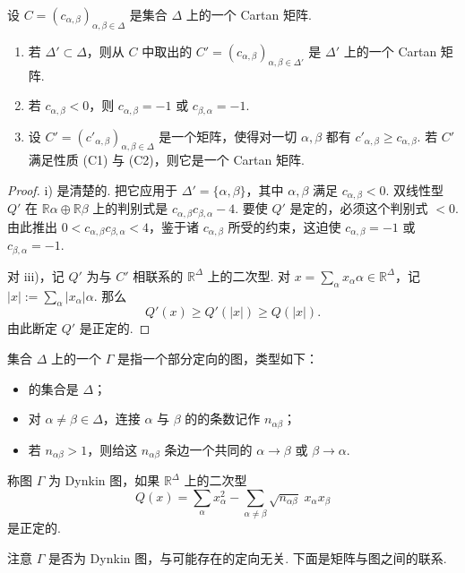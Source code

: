 \begin{lemma}\label{lemma:ssl-3-4-2}
设 $C=(c_{\alpha,\beta})_{\alpha,\beta\in\Delta}$ 是集合 $\Delta$ 上的一个 Cartan 矩阵.
\begin{enumerate}[label=\roman*)]
\item 若 $\Delta'\subset\Delta$，则从 $C$ 中取出的 $C'=(c_{\alpha,\beta})_{\alpha,\beta\in\Delta'}$ 是 $\Delta'$ 上的一个 Cartan 矩阵.
\item 若 $c_{\alpha,\beta}<0$，则 $c_{\alpha,\beta}=-1$ 或 $c_{\beta,\alpha}=-1$.
\item 设 $C'=(c'_{\alpha,\beta})_{\alpha,\beta\in\Delta}$ 是一个矩阵，使得对一切 $\alpha,\beta$ 都有 $c'_{\alpha,\beta}\geqslant c_{\alpha,\beta}$. 若 $C'$ 满足性质 (C1) 与 (C2)，则它是一个 Cartan 矩阵.
\end{enumerate}
\end{lemma}
\begin{proof}
i) 是清楚的. 把它应用于 $\Delta'=\{\alpha,\beta\}$，其中 $\alpha,\beta$ 满足 $c_{\alpha,\beta}<0$. 双线性型 $Q'$ 在 $\mathbb{R}\alpha\oplus\mathbb{R}\beta$ 上的判别式是 $c_{\alpha,\beta}c_{\beta,\alpha}-4$. 要使 $Q'$ 是定的，必须这个判别式 $<0$. 由此推出 $0<c_{\alpha,\beta}c_{\beta,\alpha}<4$，鉴于诸 $c_{\alpha,\beta}$ 所受的约束，这迫使 $c_{\alpha,\beta}=-1$ 或 $c_{\beta,\alpha}=-1$.

对 iii)，记 $Q'$ 为与 $C'$ 相联系的 $\mathbb{R}^{\Delta}$ 上的二次型. 对 $x=\sum_{\alpha}x_{\alpha}\alpha\in\mathbb{R}^{\Delta}$，记 $|x|:=\sum_{\alpha}|x_{\alpha}|\alpha$. 那么
\[Q'(x)\geqslant Q'(|x|)\geqslant Q(|x|).\]
由此断定 $Q'$ 是正定的.
\end{proof}
\begin{definition}\label{def:ssl-3-4-3}
集合 $\Delta$ 上的一个 $\Gamma$ 是指一个部分定向的图，类型如下：
\begin{itemize}
\item {}的集合是 $\Delta$；
\item 对 $\alpha\neq\beta\in\Delta$，连接 $\alpha$ 与 $\beta$ 的的条数记作 $n_{\alpha\beta}$；
\item 若 $n_{\alpha\beta}>1$，则给这 $n_{\alpha\beta}$ 条边一个共同的 $\alpha\to\beta$ 或 $\beta\to\alpha$.
\end{itemize}
称图 $\Gamma$ 为 Dynkin 图，如果 $\mathbb{R}^{\Delta}$ 上的二次型
\[Q(x)=\sum_{\alpha}x_{\alpha}^{2}-\sum_{\alpha\neq\beta}\sqrt{n_{\alpha\beta}}\;x_{\alpha}x_{\beta}\]
是正定的.
\end{definition}
注意 $\Gamma$ 是否为 Dynkin 图，与可能存在的定向无关. 下面是矩阵与图之间的联系.

